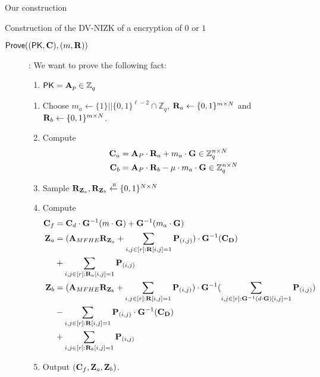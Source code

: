 \begin{section}{Our construction}
\begin{subsection}{Construction of the DV-NIZK of a encryption of $0$ or $1$}
\begin{description}
    \item[${\mathsf{Prove}}((\mathsf{PK}, \mathbf{C}), (m, \mathbf{R}))$]:
      We want to prove the following fact:
      \begin{enumerate}
      \item $\mathsf{PK} = \mathbf{A}_p \in \mathbb{Z}_q^{}$
      \end{enumerate}
      \begin{enumerate}
      \item Choose $m_a \gets \{1\}||\{0,1\}^{\ell-2} \cap \mathbb{Z}_q$, $\mathbf{R}_a \gets \{0,1\}^{m \times N}$ and $\mathbf{R}_b \gets \{0,1\}^{m \times N}$.
      \item Compute
        \begin{align*}
          \mathbf{C}_a &= \mathbf{A}_P \cdot \mathbf{R}_a + m_a \cdot \mathbf{G} \in \mathbb{Z}_q^{n \times N}\\
          \mathbf{C}_b &= \mathbf{A}_P \cdot \mathbf{R}_b - \mu \cdot m_a \cdot \mathbf{G} \in \mathbb{Z}_q^{n \times N}          
        \end{align*}
      \item Sample $\mathbf{R}_{\mathbf{Z}_a}, \mathbf{R}_{\mathbf{Z}_b}  \stackrel{{\scriptscriptstyle \mkern4mu R}}{\gets} \{0,1\}^{N\times N}$ 
      \item Compute
        \begin{align*}
          \mathbf{C}_f &= \mathbf{C}_d \cdot \mathbf{G}^{-1}(m \cdot \mathbf{G}) + \mathbf{G}^{-1}(m_a \cdot \mathbf{G})\\
          \mathbf{Z}_a &= (\mathbf{A}_{MFHE} \mathbf{R}_{\mathbf{Z}_a}  + \sum_{i,j\in [r]: \mathbf{R}[i,j] = 1} \mathbf{P}_{(i,j)}) \cdot \mathbf{G}^{-1}(\mathbf{C}_{\mathbf{D}}) \\
          &+ \sum_{i,j \in [r]: \mathbf{R}_a[i,j]= 1}\mathbf{P}_{(i,j)}\\
          \mathbf{Z}_b &= (\mathbf{A}_{MFHE} \mathbf{R}_{\mathbf{Z}_b}  + \sum_{i,j\in [r]: \mathbf{R}[i,j] = 1} \mathbf{P}_{(i,j)}) \cdot \mathbf{G}^{-1}(\sum_{i,j\in [r]: \mathbf{G}^{-1}(d \cdot \mathbf{G})[i,j] = 1} \mathbf{P}_{(i,j)})\\
          &- \sum_{i,j\in [r]: \mathbf{R}[i,j] = 1} \mathbf{P}_{(i,j)} \cdot \mathbf{G}^{-1}(\mathbf{C}_{\mathbf{D}}) \\
          &+ \sum_{i,j \in [r]: \mathbf{R}_b[i,j]= 1}\mathbf{P}_{(i,j)}\\
        \end{align*}
      \item Output $(\mathbf{C}_f, \mathbf{Z}_a, \mathbf{Z}_b)$.
      \end{enumerate}
      

\end{description}
\end{subsection}
\end{section}
